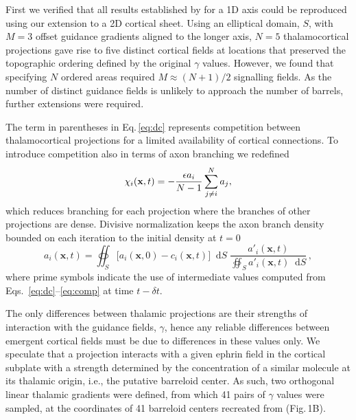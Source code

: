 \documentclass[9pt,lineno]{elife}
\newcommand*\dif{\mathop{}\!\mathrm{d}}
\begin{document}
First we verified that all results established by \cite{karbowski_model_2004}
for a 1D axis could be reproduced using our extension to a 2D cortical
sheet. Using an elliptical domain, $S$, with $M=3$ offset guidance gradients
aligned to the longer axis, $N=5$ thalamocortical projections gave rise to
five distinct cortical fields at locations that preserved the topographic
ordering defined by the original $\gamma$ values. However, we found that
specifying $N$ ordered areas required $M\approx (N+1)/2$ signalling fields. As
the number of distinct guidance fields is unlikely to approach the number of
barrels, further extensions were required.

The term in parentheses in Eq.\,\ref{eq:dc} represents competition between
thalamocortical projections for a limited availability of cortical
connections. To introduce competition also in terms of axon branching we
redefined
%
\begin{equation} \label{eq:comp}
\chi_i(\mathbf{x}, t) = - \frac{\epsilon  a_i}{N-1} \sum_{j \ne i}^{N} a_{j},
\end{equation}
%
which reduces branching for each projection where the branches of other
projections are dense. Divisive normalization keeps the axon branch density
bounded on each iteration to the initial density  at $t=0$
%
\begin{equation} \label{eq:norm}
  a_i(\mathbf{x}, t) = \oiint_{S} \big[ a_i(\mathbf{x}, 0) - c_i(\mathbf{x}, t) \big] \dif S \; \frac {a'_i(\mathbf{x}, t)} {\oiint_{S}
  a'_i(\mathbf{x}, t) \dif S}\,,
\end{equation}
%
where prime symbols indicate the use of intermediate values computed from
Eqs.~\ref{eq:dc}--\ref{eq:comp} at time $t-{\delta}t$. 

The only differences between thalamic projections are their strengths of
interaction with the guidance fields, $\gamma$, hence any reliable differences
between emergent cortical fields must be due to differences in these values
only. We speculate that a projection interacts with a given ephrin field in
the cortical subplate with a strength determined by the concentration of a
similar molecule at its thalamic origin, i.e., the putative barreloid
center. As such, two orthogonal linear thalamic gradients were defined, from
which 41 pairs of $\gamma$ values were sampled, at the coordinates of 41
barreloid centers recreated from \citealp{haidarliu_size_2001} (Fig.\,1B).
\end{document}
